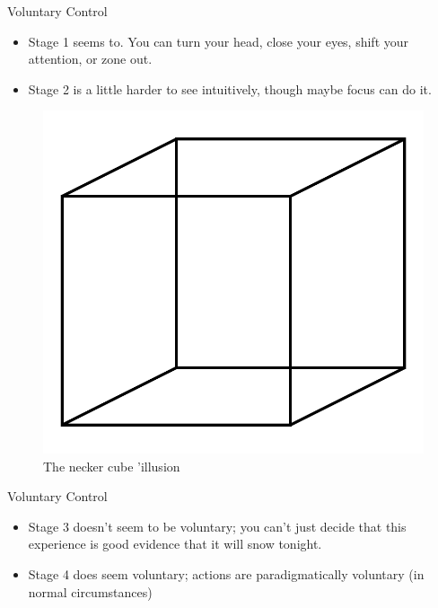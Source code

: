 \documentclass[
  17pt,
  letterpaper,
  ignorenonframetext,
  aspectratio=169,
  xcolor={dvipsnames}]{beamer}
\providecommand{\tightlist}{%
  \setlength{\itemsep}{0pt}\setlength{\parskip}{0pt}}\usepackage{longtable,booktabs,array}
\begin{document}
\begin{frame}{Voluntary Control}
\protect\hypertarget{voluntary-control}{}
\begin{itemize}[<+->]
\tightlist
\item
  Stage 1 seems to. You can turn your head, close your eyes, shift your
  attention, or zone out.
\item
  Stage 2 is a little harder to see intuitively, though maybe focus can
  do it.
\end{itemize}
\end{frame}

\begin{frame}
\begin{figure}

{\centering \includegraphics[width=\textwidth,height=0.6\textheight]{../images/necker.png}

}

\caption{The necker cube 'illusion}

\end{figure}
\end{frame}

\begin{frame}{Voluntary Control}
\protect\hypertarget{voluntary-control-1}{}
\begin{itemize}[<+->]
\tightlist
\item
  Stage 3 doesn't seem to be voluntary; you can't just decide that this
  experience is good evidence that it will snow tonight.
\item
  Stage 4 does seem voluntary; actions are paradigmatically voluntary
  (in normal circumstances)
\end{itemize}
\end{frame}
\end{document}
